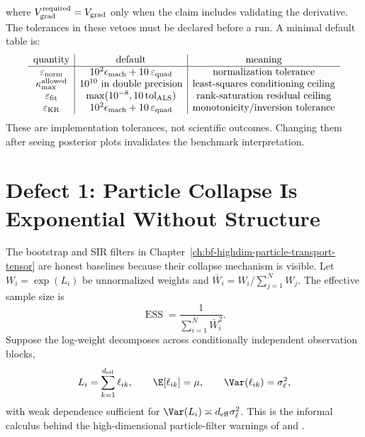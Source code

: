 where \(V_{\rm grad}^{\rm required}=V_{\rm grad}\) only when the claim includes
validating the derivative.  The tolerances in these vetoes must be declared
before a run.  A minimal default table is:
\begin{equation}
\begin{array}{c|c|c}
\text{quantity} & \text{default} & \text{meaning}\\
\hline
\varepsilon_{\rm norm} & 10^2\epsilon_{\rm mach}+10\,\varepsilon_{\rm quad} & \text{normalization tolerance}\\
\kappa_{\rm max}^{\rm allowed} & 10^{10}\ \text{in double precision} & \text{least-squares conditioning ceiling}\\
\varepsilon_{\rm fit} & \max(10^{-8},10\,{\rm tol}_{\rm ALS}) & \text{rank-saturation residual ceiling}\\
\varepsilon_{\rm KR} & 10^2\epsilon_{\rm mach}+10\,\varepsilon_{\rm quad} & \text{monotonicity/inversion tolerance}
\end{array}
  \label{eq:bf-hd-veto-defaults}
\end{equation}
These are implementation tolerances, not scientific outcomes.  Changing them
after seeing posterior plots invalidates the benchmark interpretation.

\section[Particle Collapse]{Defect 1: Particle Collapse Is Exponential Without Structure}
\label{sec:bf-hd-defect-particles}

The bootstrap and SIR filters in Chapter~\ref{ch:bf-highdim-particle-transport-tensor}
are honest baselines because their collapse mechanism is visible.  Let
$W_i=\exp(L_i)$ be unnormalized weights and
$\bar W_i=W_i/\sum_{j=1}^N W_j$.  The effective sample size is
\begin{equation}
  \operatorname{ESS}=\frac{1}{\sum_{i=1}^N \bar W_i^2}.
  \label{eq:bf-hd-synth-ess}
\end{equation}
Suppose the log-weight decomposes across conditionally independent observation
blocks,
\begin{equation}
  L_i=\sum_{k=1}^{d_{\mathrm{eff}}} \ell_{ik},\qquad
  \E[\ell_{ik}]=\mu,\qquad \Var(\ell_{ik})=\sigma_\ell^2,
  \label{eq:bf-hd-synth-logweight}
\end{equation}
with weak dependence sufficient for
\(\Var(L_i)\asymp d_{\mathrm{eff}}\sigma_\ell^2\).  This is the informal
calculus behind the high-dimensional particle-filter warnings of
\citet{bengtsson2008curse} and \citet{snyder2008obstacles}.

